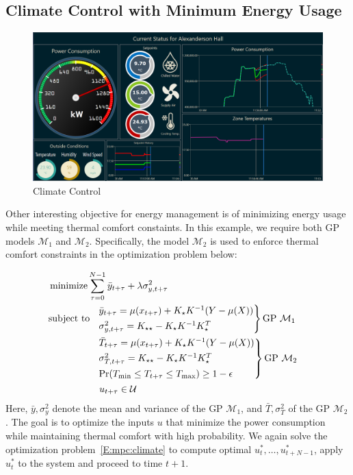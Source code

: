 \subsection{Climate Control with Minimum Energy Usage}

\begin{figure}[t]
  \centering
  \includegraphics[width=0.9\linewidth]{images/Dashboard-DR.png}
  \caption{Climate Control}
  \label{F:climate}
\end{figure}

Other interesting objective for energy management is of minimizing energy usage while meeting thermal comfort constaints. In this example, we require both GP models \(\mathcal{M}_1\) and \(\mathcal{M}_2\).
Specifically, the model \(\mathcal{M}_2\) is used to enforce thermal comfort constraints in the optimization problem below:

\begin{align}
&\operatorname*{minimize} \sum_{\tau=0}^{N-1} \bar{y}_{t+\tau} + \lambda \sigma^2_{y,t+\tau} \label{E:mpc:climate} \\
& 
\begin{aligned}
\text{subject to}\ \  & \begin{rcases}\bar{y}_{t+\tau} = \mu(x_{t+\tau}) + K_\star K^{-1} (Y - \mu(X)) \nonumber\\
\sigma^2_{y,t+\tau} = K_{\star \star} - K_\star K^{-1} K_\star^T
\end{rcases} \text{GP } \mathcal{M}_1 \\
& \begin{rcases}
 \bar{T}_{t+\tau} = \mu(x_{t+\tau}) + K_\star K^{-1} (Y - \mu(X)) \nonumber\\
\sigma^2_{T,t+\tau} = K_{\star \star} - K_\star K^{-1} K_\star^T \\
\Pr(T_{\mathrm{min}} \leq T_{t+\tau} \leq T_{\mathrm{max}}) \geq 1 - \epsilon \nonumber
\end{rcases} \text{GP } \mathcal{M}_2 \\
& \ u_{t+\tau} \in \mathcal{U} \nonumber
\end{aligned}
\end{align}
Here, \(\bar{y},\sigma^2_{y}\) denote the mean and variance of the GP \(\mathcal{M}_1\), and \(\bar{T},\sigma^2_{T}\) of the GP \(\mathcal{M}_2\). 
The goal is to optimize the inputs \(u\) that minimize the power consumption while maintaining thermal comfort with high probability. 
We again solve the optimization problem~\eqref{E:mpc:climate} to compute optimal \(u_{t}^*, \dots, u_{t+N-1}^*\), apply \(u_{t}^*\) to the system and proceed to time \(t+1\).


